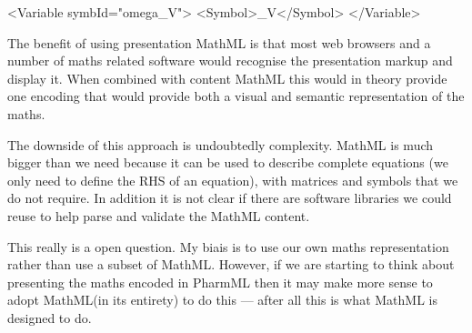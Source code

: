 \documentclass[a4paper,11pt]{article}
\newcommand{\mathml}{MathML\xspace}
\newcommand{\pharmml}{PharmML\xspace}
\begin{document}
\begin{xmlcode}
<Variable symbId="omega_V">
    <Symbol>\omega_V</Symbol>
</Variable>
\end{xmlcode}

The benefit of using presentation \mathml is that most web browsers
and a number of maths related software would recognise the
presentation markup and display it. When combined with content \mathml
this would in theory provide one encoding that would provide both a
visual and semantic representation of the maths.

The downside of this approach is undoubtedly complexity. \mathml is
much bigger than we need because it can be used to describe complete
equations (we only need to define the RHS of an equation), with
matrices and symbols that we do not require. In addition it is not
clear if there are software libraries we could reuse to help parse and
validate the \mathml content.

This really is a open question. My biais is to use our own maths
representation rather than use a subset of \mathml. However, if we are
starting to think about presenting the maths encoded in \pharmml then
it may make more sense to adopt \mathml (in its entirety) to do this
--- after all this is what \mathml is designed to do.



\end{document}
